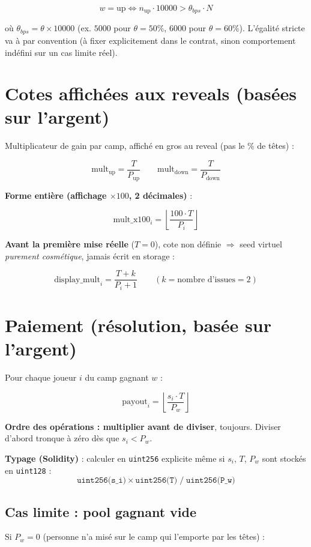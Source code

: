 \documentclass[11pt]{article}
\newcommand{\up}{\text{up}}
\newcommand{\down}{\text{down}}
\begin{document}
\[
w = \up \iff n_\up \cdot 10000 > \theta_{bps} \cdot N
\]

où $\theta_{bps} = \theta \times 10000$ (ex. $5000$ pour $\theta=50\%$, $6000$ pour $\theta=60\%$). L'égalité stricte va à \down{} par convention (à fixer explicitement dans le contrat, sinon comportement indéfini sur un cas limite réel).

\section{Cotes affichées aux reveals (basées sur l'argent)}

Multiplicateur de gain par camp, affiché en gros au reveal (pas le \% de têtes) :

\[
\text{mult}_\up = \frac{T}{P_\up} \qquad \text{mult}_\down = \frac{T}{P_\down}
\]

\textbf{Forme entière (affichage $\times 100$, 2 décimales)} :

\[
\text{mult\_x100}_i = \left\lfloor \frac{100 \cdot T}{P_i} \right\rfloor
\]

\textbf{Avant la première mise réelle} ($T=0$), cote non définie $\Rightarrow$ seed virtuel \emph{purement cosmétique}, jamais écrit en storage :

\[
\text{display\_mult}_i = \frac{T + k}{P_i + 1} \qquad (k = \text{nombre d'issues} = 2)
\]

\section{Paiement (résolution, basée sur l'argent)}

Pour chaque joueur $i$ du camp gagnant $w$ :

\[
\text{payout}_i = \left\lfloor \frac{s_i \cdot T}{P_w} \right\rfloor
\]

\textbf{Ordre des opérations : multiplier avant de diviser}, toujours. Diviser d'abord tronque à zéro dès que $s_i < P_w$.

\textbf{Typage (Solidity)} : calculer en \texttt{uint256} explicite même si $s_i$, $T$, $P_w$ sont stockés en \texttt{uint128} :
\[
\texttt{uint256(s\_i)} \times \texttt{uint256(T)} \;/\; \texttt{uint256(P\_w)}
\]

\subsection*{Cas limite : pool gagnant vide}

Si $P_w = 0$ (personne n'a misé sur le camp qui l'emporte par les têtes) :
\end{document}
